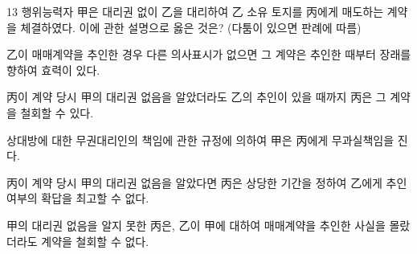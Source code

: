 \begin{question}{13}
행위능력자 甲은 대리권 없이 乙을 대리하여 乙 소유 토지를 丙에게 매도하는 계약을 체결하였다. 이에 관한 설명으로 옳은 것은? (다툼이 있으면 판례에 따름)
\begin{choices}
  \item 乙이 매매계약을 추인한 경우 다른 의사표시가 없으면 그 계약은 추인한 때부터 장래를 향하여 효력이 있다.
  \item 丙이 계약 당시 甲의 대리권 없음을 알았더라도 乙의 추인이 있을 때까지 丙은 그 계약을 철회할 수 있다.
  \item 상대방에 대한 무권대리인의 책임에 관한 규정에 의하여 甲은 丙에게 무과실책임을 진다.
  \item 丙이 계약 당시 甲의 대리권 없음을 알았다면 丙은 상당한 기간을 정하여 乙에게 추인 여부의 확답을 최고할 수 없다.
  \item 甲의 대리권 없음을 알지 못한 丙은, 乙이 甲에 대하여 매매계약을 추인한 사실을 몰랐더라도 계약을 철회할 수 없다.
\end{choices}
\end{question}
